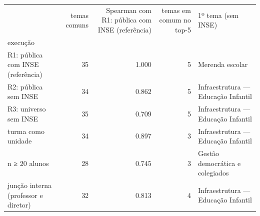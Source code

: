 \begin{tabular}{lrrrl}
\toprule
 & temas comuns & Spearman com R1: pública com INSE (referência) & temas em comum no top-5 & 1º tema (sem INSE) \\
execução &  &  &  &  \\
\midrule
R1: pública com INSE (referência) & 35 & 1.000 & 5 & Merenda escolar \\
R2: pública sem INSE & 34 & 0.862 & 5 & Infraestrutura — Educação Infantil \\
R3: universo sem INSE & 35 & 0.709 & 5 & Infraestrutura — Educação Infantil \\
turma como unidade & 34 & 0.897 & 3 & Infraestrutura — Educação Infantil \\
n ≥ 20 alunos & 28 & 0.745 & 3 & Gestão democrática e colegiados \\
junção interna (professor e diretor) & 32 & 0.813 & 4 & Infraestrutura — Educação Infantil \\
\bottomrule
\end{tabular}
